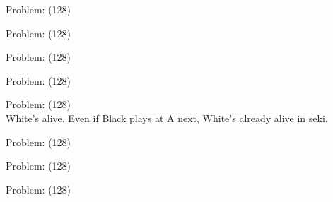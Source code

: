 \documentclass[11pt]{article}
\begin{document}
\begin{minipage}[t]{0.5\textwidth}
  {\centering
  
Problem: (128)\\
  }
\end{minipage}
\begin{minipage}[t]{0.5\textwidth}
  {\centering
  
Problem: (128)\\
  }
\end{minipage}
\begin{minipage}[t]{0.5\textwidth}
  {\centering
  
Problem: (128)\\
  }
\end{minipage}
\begin{minipage}[t]{0.5\textwidth}
  {\centering
  
Problem: (128)\\
  }
\end{minipage}
\begin{minipage}[t]{0.5\textwidth}
  {\centering
  
Problem: (128)\\
White's alive. Even if Black plays at A next, White's already alive in seki.\\
  }
\end{minipage}
\begin{minipage}[t]{0.5\textwidth}
  {\centering
  
Problem: (128)\\
  }
\end{minipage}
\begin{minipage}[t]{0.5\textwidth}
  {\centering
  
Problem: (128)\\
  }
\end{minipage}
\begin{minipage}[t]{0.5\textwidth}
  {\centering
  
Problem: (128)\\
  }
\end{minipage}
\end{document}
